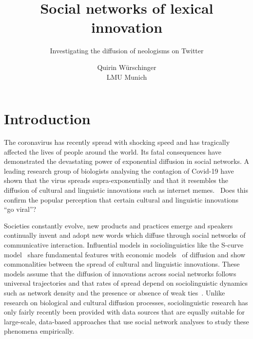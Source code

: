 \documentclass[a4paper]{scrartcl}
\begin{document}

  \title{Social networks of lexical innovation}
  \subtitle{Investigating the diffusion of neologisms on Twitter}
  \author{Quirin Würschinger\\ LMU Munich}
  \maketitle


\tableofcontents

\cleardoublepage

\listoffigures

\listoftables

\cleardoublepage


\section{Introduction}

  The coronavirus has recently spread with shocking speed and has tragically affected the lives of people around the world. Its fatal consequences have demonstrated the devastating power of exponential diffusion in social networks. A leading research group of biologists analysing the contagion of Covid-19 have shown that the virus spreads supra-exponentially and that it resembles the diffusion of cultural and linguistic innovations such as internet memes.~\parencite{EandT2020} Does this confirm the popular perception that certain cultural and linguistic innovations \enquote{go viral}?


  Societies constantly evolve, new products and practices emerge and speakers continually invent and adopt new words which diffuse through social networks of communicative interaction. Influential models in sociolinguistics like the S-curve model~\parencite{Milroy1992} share fundamental features with economic models~\parencite{Rogers1962} of diffusion and show commonalities between the spread of cultural and linguistic innovations. These models assume that the diffusion of innovations across social networks follows universal trajectories and that rates of spread depend on sociolinguistic dynamics such as network density and the presence or absence of weak ties~\parencite{Granovetter1977}. Unlike research on biological and cultural diffusion processes, sociolinguistic research has only fairly recently been provided with data sources that are equally suitable for large-scale, data-based approaches that use social network analyses to study these phenomena empirically.
\end{document}
